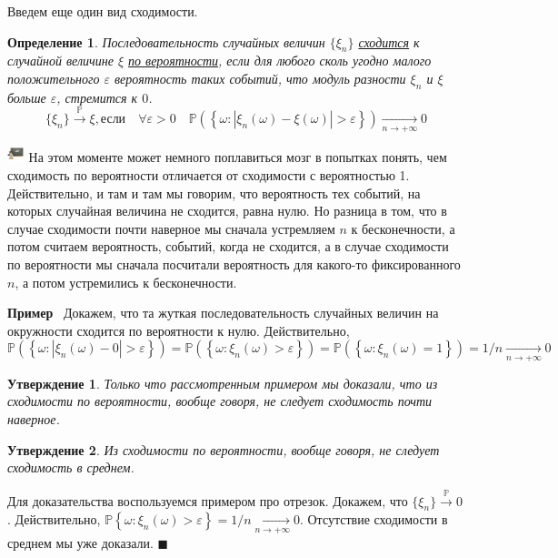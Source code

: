 \documentclass[12pt]{article}
\newtheorem{Def}{Определение}
\newtheorem{St}{Утверждение}
\newenvironment{Proof}{\par\noindent{\bf Доказательство}}{$\blacksquare$}
\newenvironment{Ex}{{\bf Пример}\ }{}
\newenvironment{Wtf}{\includegraphics[height=5mm]{ping}}{}
\numberwithin{Th}{section}
\numberwithin{Def}{section}
\numberwithin{Lem}{section}
\numberwithin{St}{section}
\numberwithin{equation}{section}
\newcommand\Set[2]{\left\{ #1 \colon #2 \right\}}
\newcommand\Pro{\mathbb{P}} %
\begin{document}
Введем еще один вид сходимости.

\begin{Def}
Последовательность случайных величин $\{\xi_n\}$ \uline{сходится} к случайной величине $\xi$ \uline{по вероятности}, если для любого сколь угодно малого положительного $\varepsilon$ вероятность таких событий, что модуль разности $\xi_n$ и $\xi$ больше $\varepsilon$, стремится к $0$.
$$\{\xi_n\} \xrightarrow{\Pro} \xi, \text{если} \quad \forall \varepsilon > 0 \quad \Pro(\Set{\omega}{|\xi_n(\omega) - \xi(\omega)| > \varepsilon}) \xrightarrow[n \rightarrow +\infty]{} 0$$
\end{Def}

\begin{Wtf}
На этом моменте может немного поплавиться мозг в попытках понять, чем сходимость по вероятности отличается от сходимости с вероятностью 1. Действительно, и там и там мы говорим, что вероятность тех событий, на которых случайная величина не сходится, равна нулю. Но разница в том, что в случае сходимости почти наверное мы сначала устремляем $n$ к бесконечности, а потом считаем вероятность, событий, когда не сходится, а в случае сходимости по вероятности мы сначала посчитали вероятность для какого-то фиксированного $n$, а потом устремились к бесконечности. 
\end{Wtf}

\begin{Ex}
Докажем, что та жуткая последовательность случайных величин на окружности сходится по вероятности к нулю. Действительно, 
$$\Pro(\Set{\omega}{|\xi_n(\omega) - 0| > \varepsilon}) = \Pro(\Set{\omega}{\xi_n(\omega) > \varepsilon}) = \Pro(\Set{\omega}{\xi_n(\omega) = 1}) = 1/n \xrightarrow[n \rightarrow +\infty]{} 0$$
\end{Ex}

\begin{St}
Только что рассмотренным примером мы доказали, что из сходимости по вероятности, вообще говоря, не следует сходимость почти наверное.
\end{St}

\begin{St}
Из сходимости по вероятности, вообще говоря, не следует сходимость в среднем.
\end{St}

\begin{Proof}
Для доказательства воспользуемся примером про отрезок. Докажем, что $\{\xi_n\} \xrightarrow{\Pro} 0$. Действительно, $\Pro{\Set{\omega}{\xi_n(\omega) > \varepsilon}} = 1/n \xrightarrow[n \rightarrow +\infty]{} 0$. Отсутствие сходимости в среднем мы уже доказали.
\end{Proof}
\end{document}

